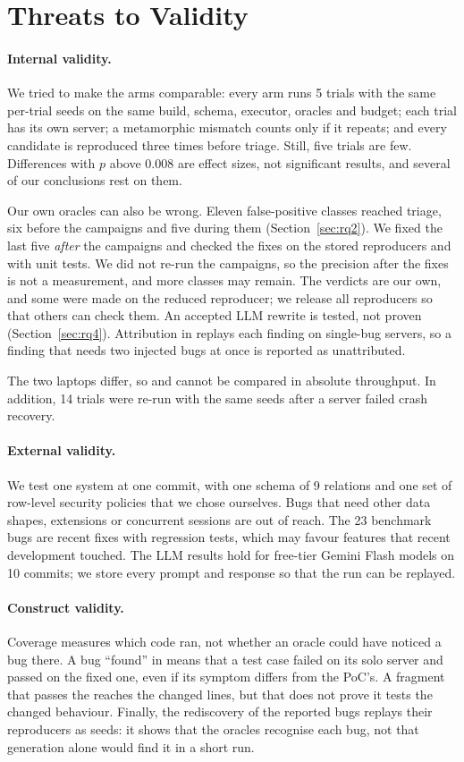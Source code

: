 \section{Threats to Validity}
\label{sec:threats}

\paragraph{Internal validity.} We tried to make the arms comparable: every arm
runs 5 trials with the same per-trial seeds on the same build, schema, executor,
oracles and budget; each trial has its own server; a metamorphic mismatch counts
only if it repeats; and every candidate is reproduced three times before triage.
Still, five trials are few. Differences with $p$ above 0.008 are effect sizes,
not significant results, and several of our conclusions rest on them.

Our own oracles can also be wrong. Eleven false-positive classes reached
triage, six before the campaigns and five during them (Section~\ref{sec:rq2}).
We fixed the last five \emph{after} the campaigns and checked the fixes on the
stored reproducers and with unit tests. We did not re-run the campaigns, so the
precision after the fixes is not a measurement, and more classes may remain.
The verdicts are our own, and some were made on the reduced reproducer; we
release all reproducers so that others can check them. An accepted LLM rewrite
is tested, not proven (Section~\ref{sec:rq4}). Attribution in  replays
each finding on single-bug servers, so a finding that needs two injected bugs at
once is reported as unattributed.

The two laptops differ, so  and  cannot be compared in
absolute throughput. In addition, 14  trials were re-run with the same
seeds after a server failed crash recovery.

\paragraph{External validity.} We test one system at one commit, with one schema
of 9 relations and one set of row-level security policies that we chose
ourselves. Bugs that need other data shapes, extensions or concurrent sessions
are out of reach. The 23 benchmark bugs are recent fixes with regression tests,
which may favour features that recent \pg development touched. The LLM results
hold for free-tier Gemini Flash models on 10 commits; we store every prompt and
response so that the run can be replayed.

\paragraph{Construct validity.} Coverage measures which code ran, not whether
an oracle could have noticed a bug there. A bug ``found'' in  means
that a test case failed on its solo server and passed on the fixed one, even if
its symptom differs from the PoC's. A fragment that passes the \gate reaches the
changed lines, but that does not prove it tests the changed behaviour. Finally,
the rediscovery of the reported bugs replays their reproducers as seeds: it
shows that the oracles recognise each bug, not that generation alone would find
it in a short run.
